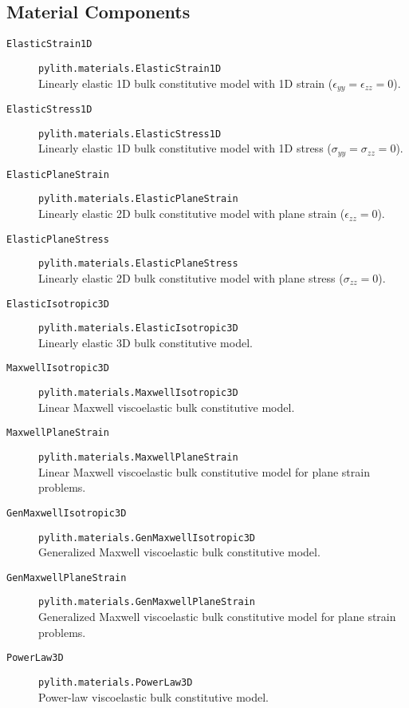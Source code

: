 \subsection{Material Components}
\begin{description}
\item [{\texttt{ElasticStrain1D}}] \texttt{pylith.materials.ElasticStrain1D}\\
Linearly elastic 1D bulk constitutive model with 1D strain ($\epsilon_{yy}=\epsilon_{zz}=0$).
\item [{\texttt{ElasticStress1D}}] \texttt{pylith.materials.ElasticStress1D}\\
Linearly elastic 1D bulk constitutive model with 1D stress ($\sigma_{yy}=\sigma_{zz}=0$).
\item [{\texttt{ElasticPlaneStrain}}] \texttt{pylith.materials.ElasticPlaneStrain}\\
Linearly elastic 2D bulk constitutive model with plane strain ($\epsilon_{zz}=0$).
\item [{\texttt{ElasticPlaneStress}}] \texttt{pylith.materials.ElasticPlaneStress}\\
Linearly elastic 2D bulk constitutive model with plane stress ($\sigma_{zz}=0$).
\item [{\texttt{ElasticIsotropic3D}}] \texttt{pylith.materials.ElasticIsotropic3D}\\
Linearly elastic 3D bulk constitutive model.
\item [{\texttt{MaxwellIsotropic3D}}] \texttt{pylith.materials.MaxwellIsotropic3D}\\
Linear Maxwell viscoelastic bulk constitutive model.
\item [{\texttt{MaxwellPlaneStrain}}] \texttt{pylith.materials.MaxwellPlaneStrain}\\
Linear Maxwell viscoelastic bulk constitutive model for plane strain
problems.
\item [{\texttt{GenMaxwellIsotropic3D}}] \texttt{pylith.materials.GenMaxwellIsotropic3D}\\
Generalized Maxwell viscoelastic bulk constitutive model.
\item [{\texttt{GenMaxwellPlaneStrain}}] \texttt{pylith.materials.GenMaxwellPlaneStrain}\\
Generalized Maxwell viscoelastic bulk constitutive model for plane
strain problems.
\item [{\texttt{PowerLaw3D}}] \texttt{pylith.materials.PowerLaw3D}\\
Power-law viscoelastic bulk constitutive model.

\end{description}
